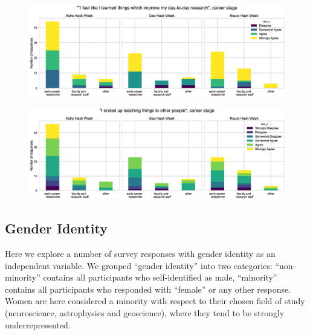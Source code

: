 \documentclass{aastex62}
\begin{document}
\begin{figure}[h!]
\centering
\includegraphics[width=\textwidth]{Q24_4_Q3_stackedbars.eps}
\caption{}
\label{fig:survey}
\end{figure}

\begin{figure}[h!]
\centering
\includegraphics[width=\textwidth]{Q23_2_Q3_stackedbars.eps}
\caption{}
\label{fig:survey}
\end{figure}

\clearpage 

\subsection{Gender Identity}

Here we explore a number of survey responses with gender identity as an independent variable. We grouped ``gender identity'' into two categories: ``non-minority'' contains all participants who self-identified as male, ``minority'' contains all participants who responded with ``female'' or any other response. Women are here considered a minority with respect to their chosen field of study (neuroscience, astrophysics and geoscience), where they tend to be strongly underrepresented. 
\end{document}
